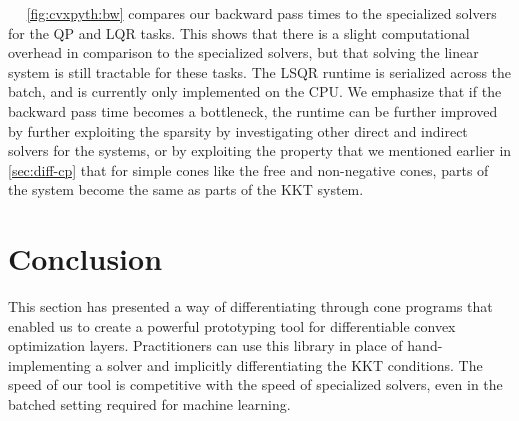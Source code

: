 \newpage~\newpage~\newpage
\cref{fig:cvxpyth:bw} compares our backward pass times to
the specialized solvers for the QP and LQR tasks.
This shows that there is a slight computational overhead
in comparison to the specialized solvers, but that
solving the linear system is still tractable for these tasks.
The LSQR runtime is serialized across the batch, and is
currently only implemented on the CPU.
We emphasize that if the backward pass time becomes a bottleneck,
the runtime can be further improved by further exploiting the
sparsity by investigating other direct and indirect solvers
for the systems, or by exploiting the property that we mentioned
earlier in \cref{sec:diff-cp} that for simple cones like the
free and non-negative cones, parts of the system become the same as
parts of the KKT system.

\section{Conclusion}
This section has presented a way of differentiating through
cone programs that enabled us to create a powerful prototyping
tool for differentiable convex optimization layers.
Practitioners can use this library in place of hand-implementing
a solver and implicitly differentiating the KKT conditions.
The speed of our tool is competitive with the speed of specialized
solvers, even in the batched setting required for machine learning.

